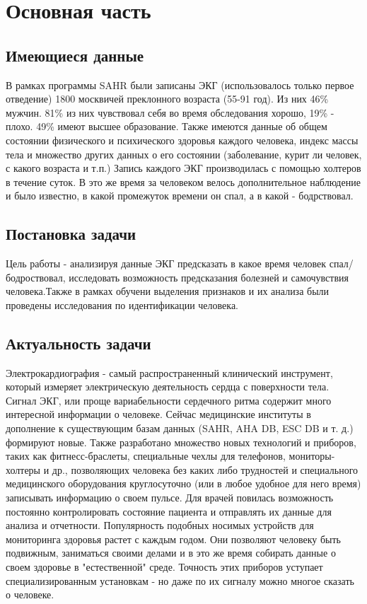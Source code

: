\chapter{Основная часть}
\section{Имеющиеся данные}
В рамках программы SAHR были записаны ЭКГ (использовалось только первое отведение) 1800 москвичей преклонного возраста (55-91 год). Из них 46\% мужчин. 81\% из них чувствовал себя во время обследования хорошо, 19\% - плохо. 49\% имеют высшее образование. Также имеются данные об общем состоянии физического и психического здоровья каждого человека, индекс массы тела и множество других данных о его состоянии (заболевание, курит ли человек, с какого возраста и т.п.) Запись каждого ЭКГ производилась с помощью холтеров в течение суток. В это же время за человеком велось дополнительное наблюдение и было известно, в какой промежуток времени он спал, а в какой - бодрствовал.
\section{Постановка задачи}

Цель работы - анализируя данные ЭКГ предсказать в какое время человек спал/бодроствовал, исследовать возможность предсказания болезней и самочувствия человека.Также в рамках обучени выделения признаков и их анализа были проведены исследования по идентификации человека.

\section{Актуальность задачи}
Электрокардиография - самый распространенный клинический инструмент, который измеряет электрическую деятельность сердца с поверхности тела. Сигнал ЭКГ, или проще вариабельности сердечного ритма содержит много интересной информации о человеке. Сейчас медицинские институты в дополнение к существующим базам данных (SAHR, AHA DB, ESC DB и т. д.) формируют новые. Также разработано множество новых технологий и приборов, таких как фитнесс-браслеты, специальные чехлы для телефонов, мониторы-холтеры и др., позволяющих человека без каких либо трудностей и специального медицинского оборудования круглосуточно (или в любое удобное для него время) записывать информацию о своем пульсе. Для врачей повилась возможность постоянно контролировать состояние пациента и отправлять их данные  для анализа и отчетности. Популярность подобных носимых устройств для мониторинга здоровья растет с каждым годом. Они позволяют человеку быть подвижным, заниматься своими делами и в это же время собирать данные о своем здоровье в "естественной" среде. Точность этих приборов уступает специализированным установкам - но даже по их сигналу можно многое сказать о человеке. 

